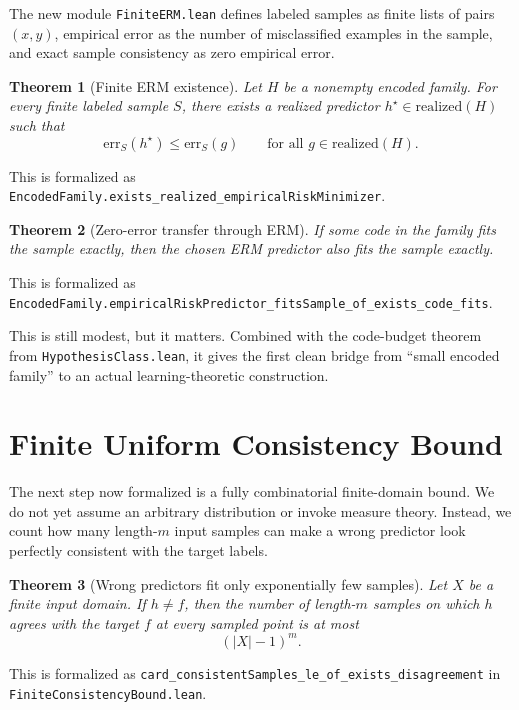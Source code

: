\documentclass[11pt]{article}
\newtheorem{theorem}{Theorem}[section]
\theoremstyle{remark}
\begin{document}
The new module \texttt{FiniteERM.lean} defines labeled samples as finite lists of
pairs \((x,y)\), empirical error as the number of misclassified examples in the
sample, and exact sample consistency as zero empirical error.

\begin{theorem}[Finite ERM existence]
Let \(H\) be a nonempty encoded family.  For every finite labeled sample \(S\),
there exists a realized predictor \(h^\star \in \mathrm{realized}(H)\) such that
\[
  \mathrm{err}_S(h^\star) \le \mathrm{err}_S(g)
  \qquad
  \text{for all } g \in \mathrm{realized}(H).
\]
\end{theorem}

\noindent
This is formalized as
\texttt{EncodedFamily.exists\_realized\_empiricalRiskMinimizer}.

\begin{theorem}[Zero-error transfer through ERM]
If some code in the family fits the sample exactly, then the chosen ERM
predictor also fits the sample exactly.
\end{theorem}

\noindent
This is formalized as
\texttt{EncodedFamily.empiricalRiskPredictor\_fitsSample\_of\_exists\_code\_fits}.

This is still modest, but it matters.  Combined with the code-budget theorem
from \texttt{HypothesisClass.lean}, it gives the first clean bridge from
``small encoded family'' to an actual learning-theoretic construction.

\section{Finite Uniform Consistency Bound}

The next step now formalized is a fully combinatorial finite-domain bound.  We
do not yet assume an arbitrary distribution or invoke measure theory.  Instead,
we count how many length-\(m\) input samples can make a wrong predictor look
perfectly consistent with the target labels.

\begin{theorem}[Wrong predictors fit only exponentially few samples]
Let \(X\) be a finite input domain.  If \(h \neq f\), then the number of
length-\(m\) samples on which \(h\) agrees with the target \(f\) at every sampled
point is at most
\[
  (|X|-1)^m.
\]
\end{theorem}

\noindent
This is formalized as
\texttt{card\_consistentSamples\_le\_of\_exists\_disagreement} in
\texttt{FiniteConsistencyBound.lean}.
\end{document}
